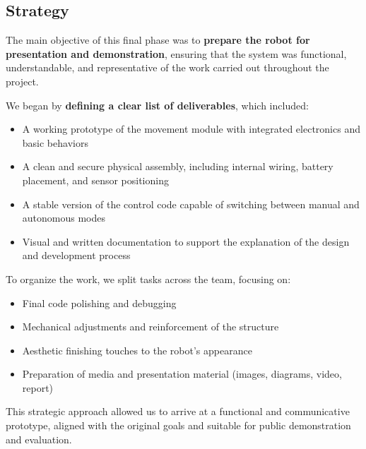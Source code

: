\subsection{Strategy}

The main objective of this final phase was to \textbf{prepare the robot for presentation and demonstration}, ensuring that the system was functional, understandable, and representative of the work carried out throughout the project.

We began by \textbf{defining a clear list of deliverables}, which included:

\begin{itemize}
    \item A working prototype of the movement module with integrated electronics and basic behaviors
    \item A clean and secure physical assembly, including internal wiring, battery placement, and sensor positioning
    \item A stable version of the control code capable of switching between manual and autonomous modes
    \item Visual and written documentation to support the explanation of the design and development process
\end{itemize}

To organize the work, we split tasks across the team, focusing on:

\begin{itemize}
    \item Final code polishing and debugging
    \item Mechanical adjustments and reinforcement of the structure
    \item Aesthetic finishing touches to the robot's appearance
    \item Preparation of media and presentation material (images, diagrams, video, report)
\end{itemize}

This strategic approach allowed us to arrive at a functional and communicative prototype, aligned with the original goals and suitable for public demonstration and evaluation.
